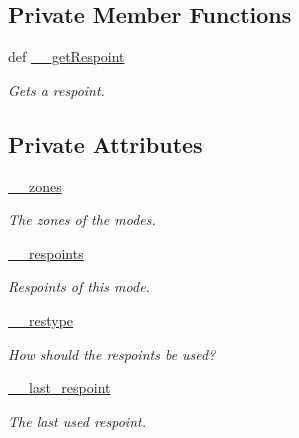 \subsection*{\-Private \-Member \-Functions}
\begin{DoxyCompactItemize}
\item 
def \hyperlink{class_mode_1_1_mode_a75c4e71d875ef172aa2bec0a45347894}{\-\_\-\-\_\-get\-Respoint}
\begin{DoxyCompactList}\small\item\em \-Gets a respoint. \end{DoxyCompactList}\end{DoxyCompactItemize}
\subsection*{\-Private \-Attributes}
\begin{DoxyCompactItemize}
\item 
\hyperlink{class_mode_1_1_mode_ad9e5c42d7d8f5870e51eb5289f45a0c4}{\-\_\-\-\_\-zones}
\begin{DoxyCompactList}\small\item\em \-The zones of the modes. \end{DoxyCompactList}\item 
\hyperlink{class_mode_1_1_mode_ae63526644bd406d62fe471ac911e6720}{\-\_\-\-\_\-respoints}
\begin{DoxyCompactList}\small\item\em \-Respoints of this mode. \end{DoxyCompactList}\item 
\hyperlink{class_mode_1_1_mode_a687ff64beaaef06119c3daf15bb59db8}{\-\_\-\-\_\-restype}
\begin{DoxyCompactList}\small\item\em \-How should the respoints be used? \end{DoxyCompactList}\item 
\hyperlink{class_mode_1_1_mode_a7fa18373a358748a612b8c3e072df277}{\-\_\-\-\_\-last\-\_\-respoint}
\begin{DoxyCompactList}\small\item\em \-The last used respoint. \end{DoxyCompactList}\end{DoxyCompactItemize}
